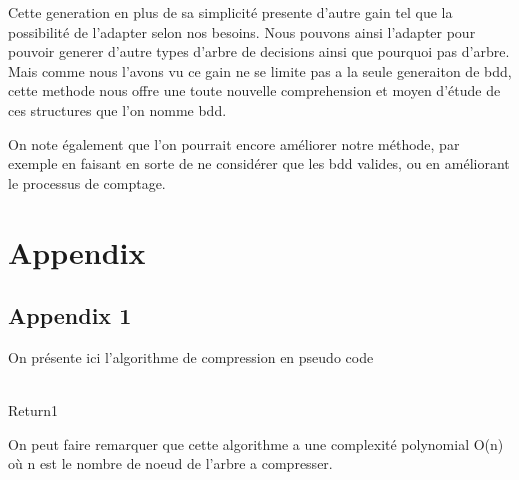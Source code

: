 \documentclass[french]{article}
\begin{document}
Cette generation en plus de sa simplicité presente d'autre gain tel que la possibilité de l'adapter selon nos besoins. Nous pouvons ainsi l'adapter pour pouvoir generer d'autre types d'arbre de decisions ainsi que pourquoi pas d'arbre. 
Mais comme nous l'avons vu ce gain ne se limite pas a la seule generaiton de bdd, cette methode nous offre une toute nouvelle comprehension et moyen d'étude de ces structures que l'on nomme bdd.

On note également que l'on pourrait encore améliorer notre méthode, par exemple en faisant en sorte de ne considérer que les bdd valides, ou en améliorant le processus de comptage. 
\newpage
\section{Appendix}
\subsection{Appendix 1}
\label{Appendix_1}
On présente ici l'algorithme de compression en pseudo code
\begin{algorithm}
  \begin{algorithmic}[1]
    \Statex
                         
                     
            \State {}
        \Else
            \\Return{1}
        \EndIf
      \Else
        \State {}         
        \State {}   
        \State {} 
        \State {}  
        \Else
            \State {}   
            \State {} 
                \State {} 
                \State {} 
                \State {} 
                \State {}
            \Else
            \EndIf\EndIf\EndIf\EndFunction
  \end{algorithmic}
\end{algorithm}

On peut faire remarquer que cette algorithme a une complexité polynomial O(n) où n est le nombre de noeud de l'arbre a compresser.

\newpage
\printbibliography
\end{document}
